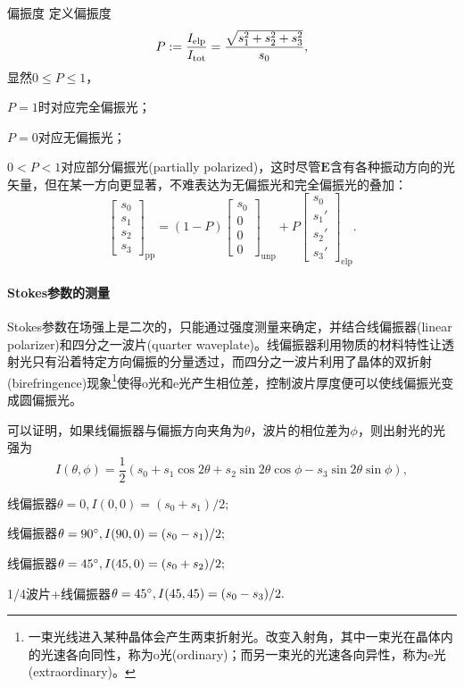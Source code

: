 \begin{definition}{偏振度}{}
    定义偏振度
    \[
        P:=\frac{I_\text{elp}}{I_\mathrm{tot}}=\frac{\sqrt{s_1^2+s_2^2+s_3^2}}{s_0},
    \]
    显然$0\leqslant P\leqslant 1$，
\end{definition}
\begin{compactitem}
	\item $P=1$时对应完全偏振光；
	\item $P=0$对应无偏振光；
	\item $0<P<1$对应部分偏振光(partially polarized)，这时尽管$\bm E$含有各种振动方向的光矢量，但在某一方向更显著，不难表达为无偏振光和完全偏振光的叠加：
    \[
        \begin{bmatrix}
            s_0\\s_1\\s_2\\s_3
        \end{bmatrix}_\text{pp}=(1-P)
        \begin{bmatrix}
            s_0\\0\\0\\0
        \end{bmatrix}_\text{unp}+P
        \begin{bmatrix}
            s_0\\s_1'\\s_2'\\s_3'
        \end{bmatrix}_\text{elp}.
    \]
\end{compactitem}
\paragraph{Stokes参数的测量}
Stokes参数在场强上是二次的，只能通过强度测量来确定，并结合线偏振器(linear polarizer)和四分之一波片(quarter waveplate)。线偏振器利用物质的材料特性让透射光只有沿着特定方向偏振的分量透过，而四分之一波片利用了晶体的双折射(birefringence)现象\footnote{一束光线进入某种晶体会产生两束折射光。改变入射角，其中一束光在晶体内的光速各向同性，称为o光(ordinary)；而另一束光的光速各向异性，称为e光(extraordinary)。}使得o光和e光产生相位差，控制波片厚度便可以使线偏振光变成圆偏振光。

可以证明，如果线偏振器与偏振方向夹角为$\theta$，波片的相位差为$\phi$，则出射光的光强为
\[
    I(\theta,\phi)=\frac12(s_0+s_1\cos2\theta+s_2\sin2\theta\cos\phi-s_3\sin2\theta\sin\phi),
\]
\begin{compactitem}
	\item 线偏振器$\theta=0,I(0,0)=(s_0+s_1)/2;$
    \item 线偏振器$\theta=90^\circ,I(90,0)=(s_0-s_1)/2;$
    \item 线偏振器$\theta=45^\circ,I(45,0)=(s_0+s_2)/2;$
    \item 1/4波片+线偏振器$\theta=45^\circ,I(45,45)=(s_0-s_3)/2.$
\end{compactitem}
